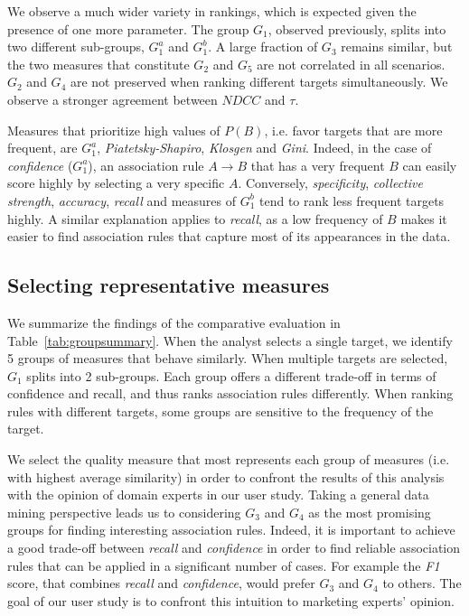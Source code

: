 We observe a much wider variety in rankings, which is expected given the presence of one more parameter.
The group $G_1$, observed previously, splits into two different sub-groups, $G_1^a$ and $G_1^b$.
A large fraction of $G_3$ remains similar,
but the two measures that constitute $G_2$ and $G_5$ are not correlated in all scenarios.
$G_2$ and $G_4$ are not preserved when ranking different targets simultaneously.
We observe a stronger agreement between $\mathit{NDCC}$ and $\tau$.

Measures that prioritize high values of $P(B)$,
i.e. favor targets that are more frequent, are $G_1^a$, {\em Piatetsky-Shapiro}, {\em Klosgen} and {\em Gini}.
Indeed, in the case of {\em confidence} ($G_1^a$),
an association rule $A\rightarrow B$ that has a very frequent $B$
can easily score highly by selecting a very specific $A$.
Conversely, {\em specificity}, {\em collective strength}, {\em accuracy}, {\em recall} and
measures of $G_1^b$ tend to rank less frequent targets highly.
A similar explanation applies to {\em recall},
as a low frequency of $B$ makes it easier to find association rules that capture most of its appearances in the data.



\subsection{Selecting representative measures}
\label{sec:selection}
We summarize the findings of the comparative evaluation in Table~\ref{tab:groupsummary}.
When the analyst selects a single target, we identify 5 groups of measures that behave similarly.
When multiple targets are selected, $G_1$ splits into 2 sub-groups.
Each group offers a different trade-off in terms of confidence and recall, and thus ranks association rules differently.
When ranking rules with different targets, some groups are sensitive to the frequency of the target.

We select the quality measure that most represents each group of measures (i.e. with highest average similarity)
in order to confront the results of this analysis with the opinion of domain experts in our user study.
Taking a general data mining perspective leads us to considering $G_3$ and $G_4$
as the most promising groups for finding interesting association rules.
Indeed, it is important to achieve a good trade-off between {\em recall} and {\em confidence}
in order to find reliable association rules that can be applied in a significant number of cases.
For example the {\em F1} score, that combines {\em recall} and {\em confidence}, would prefer $G_3$ and $G_4$ to others.
The goal of our user study is to confront this intuition to marketing experts' opinion.

